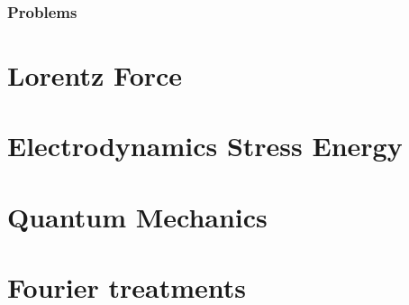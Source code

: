       
      \section{Problems}
         

\part{Lorentz Force}
   
   
   
   
   

\part{Electrodynamics Stress Energy}
   
   
   
   
   
   
   
   
   
   
   

\part{Quantum Mechanics}
   
   
   
   
   
   
   
   

\part{Fourier treatments}
   
   
   
   
   
   
   
   
   
